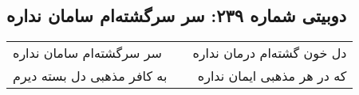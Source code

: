 \begin{center}
\section*{دوبیتی شماره ۲۳۹: سر سرگشته‌ام سامان نداره}
\label{sec:239}
\begin{longtable}{l p{0.5cm} r}
سر سرگشته‌ام سامان نداره
&&
دل خون گشته‌ام درمان نداره
\\
به کافر مذهبی دل بسته دیرم
&&
که در هر مذهبی ایمان نداره
\\
\end{longtable}
\end{center}
